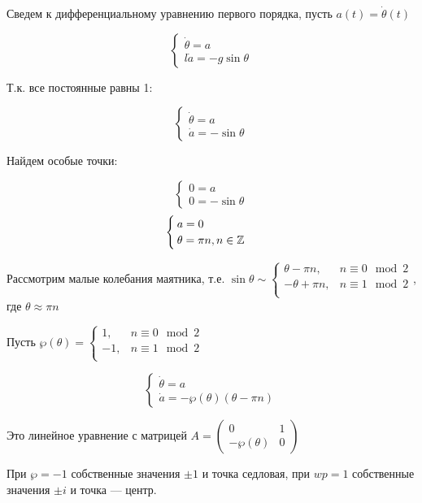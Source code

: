 Сведем к дифференциальному уравнению первого порядка, пусть \(a(t) = \dot \theta(t)\)

\[\begin{cases}
        \dot \theta = a \\
        l \dot a = - g\sin \theta
    \end{cases}\]

Т.к. все постоянные равны 1:

\[\begin{cases}
        \dot \theta = a \\
        \dot a = -\sin \theta
    \end{cases}\]

Найдем особые точки:

\[\begin{cases}
        0 = a \\
        0 = - \sin \theta
    \end{cases}\]
\[\begin{cases}
        a = 0 \\
        \theta = \pi n, n\in \mathbb{Z}
    \end{cases}\]

Рассмотрим малые колебания маятника, т.е. \(\sin \theta \sim \begin{cases}
    \theta - \pi n,  & n \equiv 0 \mod 2 \\
    -\theta + \pi n, & n \equiv 1 \mod 2 \\
\end{cases}\), где \(\theta \approx \pi n\)

Пусть \(\wp(\theta) = \begin{cases}
    1,   & n \equiv 0 \mod 2 \\
    - 1, & n \equiv 1 \mod 2 \\
\end{cases}\)

\[\begin{cases}
        \dot \theta = a \\
        \dot a = - \wp(\theta) (\theta - \pi n)
    \end{cases}\]

Это линейное уравнение с матрицей \(A = \begin{pmatrix} 0 & 1 \\ - \wp(\theta) & 0 \end{pmatrix} \)

При \(\wp = -1\) собственные значения \( \pm 1\) и точка седловая, при \(wp = 1\) собственные значения \( \pm i\) и точка --- центр.

